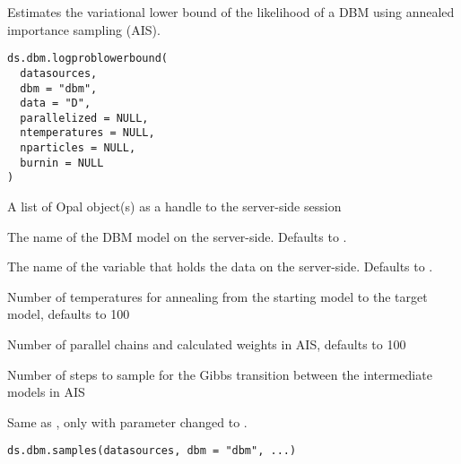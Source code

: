 %
\begin{Description}\relax
Estimates the variational lower bound of the likelihood of a DBM using
annealed importance sampling (AIS).
\end{Description}
%
\begin{Usage}
\begin{verbatim}
ds.dbm.logproblowerbound(
  datasources,
  dbm = "dbm",
  data = "D",
  parallelized = NULL,
  ntemperatures = NULL,
  nparticles = NULL,
  burnin = NULL
)
\end{verbatim}
\end{Usage}
%
\begin{Arguments}
\begin{ldescription}
\item[\code{datasources}] A list of Opal object(s) as a handle to the server-side session

\item[\code{dbm}] The name of the DBM model on the server-side. Defaults to .

\item[\code{data}] The name of the variable that holds the data on the server-side.
Defaults to .

\item[\code{ntemperatures}] Number of temperatures for annealing from the starting model
to the target model, defaults to 100

\item[\code{nparticles}] Number of parallel chains and calculated weights in AIS, defaults to 100

\item[\code{burnin}] Number of steps to sample for the Gibbs transition between the intermediate models in AIS
\end{ldescription}
\end{Arguments}
%
\begin{Description}\relax
Same as , only with parameter  changed to .
\end{Description}
%
\begin{Usage}
\begin{verbatim}
ds.dbm.samples(datasources, dbm = "dbm", ...)
\end{verbatim}
\end{Usage}
